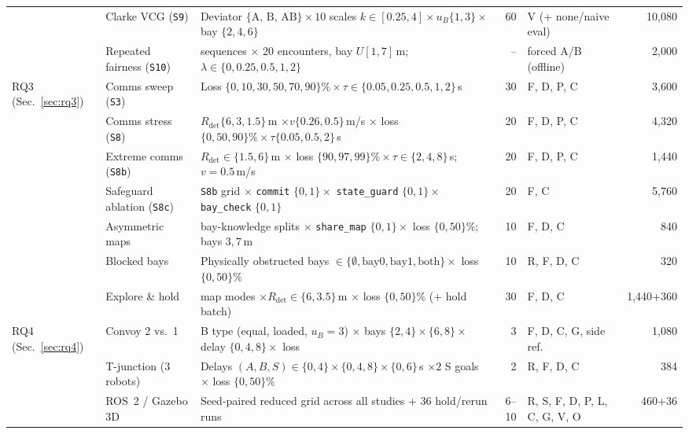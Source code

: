\documentclass[letterpaper,journal]{IEEEtran}
\begin{document}
\begin{table}[t]
{\begin{tabular}{@{}ll>{\raggedright\arraybackslash}p{}rlr@{}}
 & Clarke VCG (\texttt{S9}) & Deviator $\{\text{A, B, AB}\}\times 10$ scales $k\in[0.25,4]\times u_B\{1,3\}\times$ bay $\{2,4,6\}$ & 60 & V (+ none/naive eval) & 10,080 \\
 & Repeated fairness (\texttt{S10}) & 50 sequences $\times$ 20 encounters, bay $U[1,7]$\,m; $\lambda\in\{0,0.25,0.5,1,2\}$ & -- & forced A/B (offline) & 2,000 \\\midrule
\multirow{7}{*}{RQ3 (Sec.~\ref{sec:rq3})}
 & Comms sweep (\texttt{S3}) & Loss $\{0,10,30,50,70,90\}\%\times\tau\in\{0.05,0.25,0.5,1,2\}$\,s & 30 & F, D, P, C & 3,600 \\
 & Comms stress (\texttt{S8}) & $R_{\mathrm{det}}\{6,3,1.5\}$\,m $\times v\{0.26,0.5\}$\,m/s $\times$ loss $\{0,50,90\}\%\times\tau\{0.05,0.5,2\}$\,s & 20 & F, D, P, C & 4,320 \\
 & Extreme comms (\texttt{S8b}) & $R_{\mathrm{det}}\in\{1.5,6\}$\,m $\times$ loss $\{90,97,99\}\%\times\tau\in\{2,4,8\}$\,s; $v=0.5$\,m/s & 20 & F, D, P, C & 1,440 \\
 & Safeguard ablation (\texttt{S8c}) & \texttt{S8b} grid $\times$ \texttt{commit} $\{0,1\}\times$ \texttt{state\_guard} $\{0,1\}\times$ \texttt{bay\_check} $\{0,1\}$ & 20 & F, C & 5,760 \\
 & Asymmetric maps & 7 bay-knowledge splits $\times$ \texttt{share\_map} $\{0,1\}\times$ loss $\{0,50\}\%$; bays $3,7$\,m & 10 & F, D, C & 840 \\
 & Blocked bays & Physically obstructed bays $\in\{\emptyset,\text{bay0},\text{bay1},\text{both}\}\times$ loss $\{0,50\}\%$ & 10 & R, F, D, C & 320 \\
 & Explore \& hold & 4 map modes $\times R_{\mathrm{det}}\in\{6,3.5\}$\,m $\times$ loss $\{0,50\}\%$ (+ hold batch) & 30 & F, D, C & 1,440+360 \\\midrule
\multirow{3}{*}{RQ4 (Sec.~\ref{sec:rq4})}
 & Convoy 2 vs.\ 1 & B type (equal, loaded, $u_B=3$) $\times$ bays $\{2,4\}\times\{6,8\}\times$ delay $\{0,4,8\}\times$ loss & 3 & F, D, C, G, side ref. & 1,080 \\
 & T-junction (3 robots) & Delays $(A,B,S)\in\{0,4\}\times\{0,4,8\}\times\{0,6\}$\,s $\times 2$ S goals $\times$ loss $\{0,50\}\%$ & 2 & R, F, D, C & 384 \\
 & ROS~2 / Gazebo 3D & Seed-paired reduced grid across all studies + 36 hold/rerun runs & 6--10 & R, S, F, D, P, L, C, G, V, O & 460+36 \\\bottomrule
\end{tabular}}
\end{table}
\end{document}
